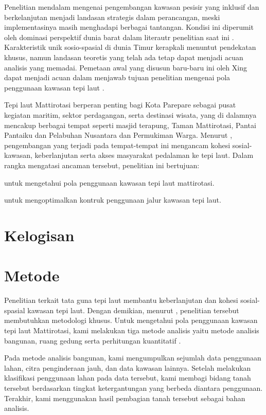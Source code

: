 \documentclass[../riset_senja.tex]{subfiles}
\begin{document}
Penelitian mendalam mengenai pengembangan kawasan pesisir yang inklusif dan berkelanjutan menjadi landasan strategis dalam perancangan, meski implementasinya masih menghadapi berbagai tantangan. Kondisi ini diperumit oleh dominasi perspektif dunia barat dalam literautr penelitian saat ini \citep{pujinda2025}. Karakteristik unik sosio-spasial di dunia Timur kerapkali menuntut pendekatan khusus, namun landasan teoretis yang telah ada tetap dapat menjadi acuan analisis yang memadai. Pemetaan awal yang disusun baru-baru ini oleh Xing dapat menjadi acuan dalam menjawab tujuan penelitian mengenai pola penggunaan kawasan tepi laut \citep{xing2025}.

Tepi laut Mattirotasi berperan penting bagi Kota Parepare sebagai pusat kegiatan maritim, sektor perdagangan, serta destinasi wisata, yang di dalamnya mencakup berbagai tempat seperti masjid terapung, Taman Mattirotasi, Pantai Pantaiku dan Pelabuhan Nusantara dan Permukiman Warga.
Menurut \citet{xing2025} , pengembangan yang terjadi pada tempat-tempat ini mengancam kohesi sosial-kawasan, keberlanjutan serta akses masyarakat pedalaman ke tepi laut. Dalam rangka mengatasi ancaman tersebut, penelitian ini bertujuan: \begin{inparaenum}  \item untuk mengetahui pola penggunaan kawasan tepi laut mattirotasi. \item untuk mengoptimalkan kontruk penggunaan jalur kawasan tepi laut.
\end{inparaenum}



\section{Kelogisan}%
\label{sec:Kelogisan}

\section{Metode}%
\label{sec:Metode}

Penelitian terkait tata guna tepi laut membantu keberlanjutan dan kohesi sosial-spasial kawasan tepi laut. Dengan demikian, menurut \citet{theodora2022} , penelitian tersebut membutuhkan metodologi khusus. Untuk mengetahui pola penggunaan kawasan tepi laut Mattirotasi, kami melakukan tiga metode analisis yaitu metode analisis bangunan, ruang gedung serta perhitungan kuantitatif \citep{xing2025}.

Pada metode analisis bangunan, kami mengumpulkan sejumlah data penggunaan lahan, citra penginderaan jauh, dan data kawasan lainnya. Setelah melakukan klasifikasi penggunaan lahan pada data tersebut, kami membagi bidang tanah tersebut berdasarkan tingkat ketergantungan yang berbeda diantara penggunaan. Terakhir, kami menggunakan hasil pembagian tanah tersebut sebagai bahan analisis.
\end{document}
